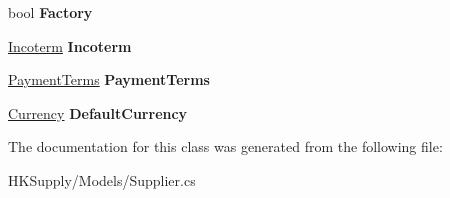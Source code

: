 \begin{DoxyCompactItemize}
\mbox{\label{class_h_k_supply_1_1_models_1_1_supplier_a4e38beacd6ff24a251f734a7392d9442}} 
bool {\bfseries Factory}
\item 
\mbox{\label{class_h_k_supply_1_1_models_1_1_supplier_a70065e1cbe7f670cee316db175b7dcf1}} 
\mbox{\hyperlink{class_h_k_supply_1_1_models_1_1_incoterm}{Incoterm}} {\bfseries Incoterm}
\item 
\mbox{\label{class_h_k_supply_1_1_models_1_1_supplier_aa29eeaa250d34976594c9607caf0f77f}} 
\mbox{\hyperlink{class_h_k_supply_1_1_models_1_1_payment_terms}{Payment\+Terms}} {\bfseries Payment\+Terms}
\item 
\mbox{\label{class_h_k_supply_1_1_models_1_1_supplier_a4a4f2fcfa44efe91847124b440899172}} 
\mbox{\hyperlink{class_h_k_supply_1_1_models_1_1_currency}{Currency}} {\bfseries Default\+Currency}
\end{DoxyCompactItemize}


The documentation for this class was generated from the following file\+:\begin{DoxyCompactItemize}
\item 
H\+K\+Supply/\+Models/Supplier.\+cs\end{DoxyCompactItemize}
